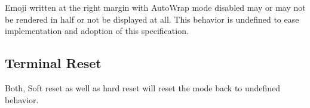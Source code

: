 \documentclass{article}
\begin{document}
Emoji written at the right margin with \cite{DECAWM} AutoWrap mode disabled
may or may not be rendered in half or not be displayed at all.
This behavior is undefined to ease implementation and adoption 
of this specification.

\subsection{Terminal Reset}

Both, Soft reset \cite{DECSTR} as well as hard reset \cite{RIS}
will reset the mode back to undefined behavior.

\printbibliography[heading=bibintoc,title={References}]
\end{document}
